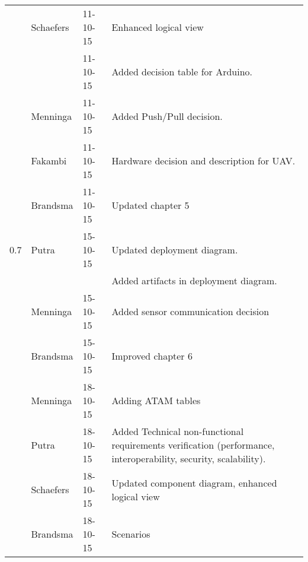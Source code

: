 \begin{longtable}{L{} L{} L{} L{}}
	                 & Schaefers             & 11-10-15      & Enhanced logical view                                                                                                                                                                                                      \\
	                 &                       & 11-10-15      & Added decision table for Arduino.                                                                                                                                                                                          \\
	                 & Menninga              & 11-10-15      & Added Push/Pull decision.                                                                                                                                                                                                  \\
	                 & Fakambi               & 11-10-15      & Hardware decision and description for UAV.                                                                                                                                                                                 \\
	                 & Brandsma              & 11-10-15      & Updated chapter 5                                                                                                                                                                                                          \\
	\midrule
			
	0.7              & Putra                 & 15-10-15      & Updated deployment diagram. \\
	                 &                       &               & Added artifacts in deployment diagram. \\
                     & Menninga				 & 15-10-15      & Added sensor communication decision \\
                     & Brandsma				 & 15-10-15		 & Improved chapter 6 \\
	                 & Menninga				 & 18-10-15      & Adding ATAM tables \\
	                 & Putra                 & 18-10-15      & Added Technical non-functional requirements verification (performance, interoperability, security, scalability). \\
	                 & Schaefers			 & 18-10-15      & Updated component diagram, enhanced logical view \\
	                 & Brandsma				 & 18-10-15		 & Scenarios \\
	\bottomrule
\end{longtable}